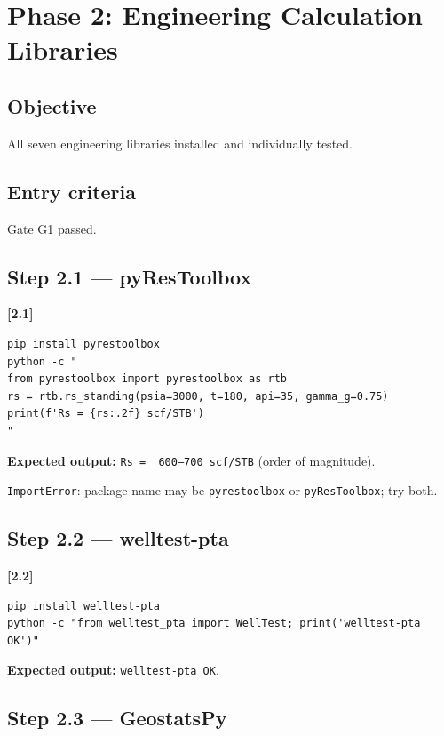 \documentclass[10pt,a4paper]{article}
\newcommand{\stepID}[1]{\textsf{\textbf{[#1]}}}
\newcommand{\cmd}[1]{\texttt{#1}}
\begin{document}
\section{Phase 2: Engineering Calculation Libraries}
\label{sec:phase2}

\subsection{Objective}
All seven engineering libraries installed and individually tested.

\subsection{Entry criteria}
Gate G1 passed.

\subsection{Step 2.1 --- pyResToolbox}

\stepID{2.1}
\begin{lstlisting}[style=sh]
pip install pyrestoolbox
python -c "
from pyrestoolbox import pyrestoolbox as rtb
rs = rtb.rs_standing(psia=3000, t=180, api=35, gamma_g=0.75)
print(f'Rs = {rs:.2f} scf/STB')
"
\end{lstlisting}

\textbf{Expected output:} \cmd{Rs = ~600--700 scf/STB} (order of magnitude).

\begin{failure}
\texttt{ImportError}: package name may be \cmd{pyrestoolbox} or \cmd{pyResToolbox}; try both.
\end{failure}

\subsection{Step 2.2 --- welltest-pta}

\stepID{2.2}
\begin{lstlisting}[style=sh]
pip install welltest-pta
python -c "from welltest_pta import WellTest; print('welltest-pta OK')"
\end{lstlisting}

\textbf{Expected output:} \cmd{welltest-pta OK}.

\subsection{Step 2.3 --- GeostatsPy}
\end{document}
